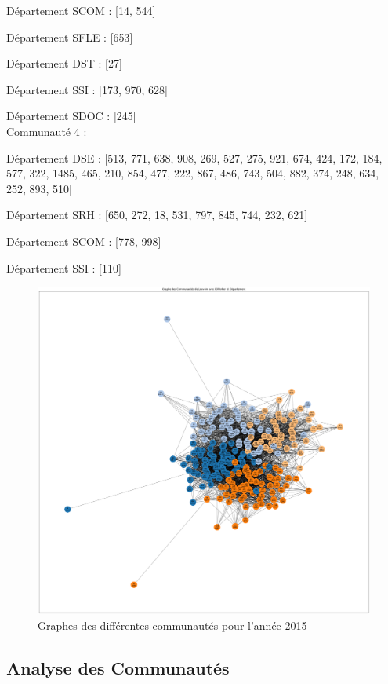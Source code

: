 \documentclass{article}
\begin{document}
Département SCOM : [14, 544]

Département SFLE : [653]

Département DST : [27]

Département SSI : [173, 970, 628]

Département SDOC : [245] \\

Communauté 4 :

Département DSE : [513, 771, 638, 908, 269, 527, 275, 921, 674, 424, 172, 184, 577, 322, 1485, 465, 210, 854, 477, 222, 867, 486, 743, 504, 882, 374, 248, 634, 252, 893, 510]

Département SRH : [650, 272, 18, 531, 797, 845, 744, 232, 621]

Département SCOM : [778, 998]

Département SSI : [110] \\

\begin{figure}[!h]
    \centering
    \includegraphics[width=15cm]{assets/communaute/communaute_2015.png}
    \caption{Graphes des différentes communautés pour l'année 2015}
    \label{fig:communaute_2015}
\end{figure}

\subsection{Analyse des Communautés}
\end{document}
